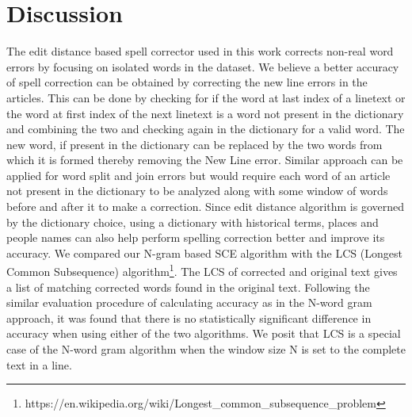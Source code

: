 \documentclass[preprint,11pt]{elsarticle}
\begin{document}
\section{Discussion}
\label{spell:discuss}
The edit distance based spell corrector used in this work corrects non-real word errors by focusing on isolated words in the dataset.
We believe a better accuracy of spell correction can be obtained by correcting the new line errors in the articles. This can be done by checking for if the word at last index of a linetext or the word at first index of the next linetext is a word not present in the dictionary and combining the two and checking again in the dictionary for a valid word. The new word, if present in the dictionary can be replaced by the two words from which it is formed thereby removing the New Line error. Similar approach can be applied for word split and join errors but would require each word of an article not present in the dictionary to be analyzed along with some window of words before and after it to make a correction. 
Since edit distance algorithm is governed by the dictionary choice, using a dictionary with historical terms, places and people names can also help perform spelling correction better and improve its accuracy.
We compared our N-gram based SCE algorithm with the LCS (Longest Common Subsequence) algorithm\footnote{https://en.wikipedia.org/wiki/Longest\_common\_subsequence\_problem}. The LCS of corrected and original text gives a list of matching corrected words found in the original text. Following the similar evaluation procedure of calculating accuracy as in the N-word gram approach, %
it was found that there is no statistically significant difference in accuracy when using either of the two algorithms. We posit that LCS is a special case of the N-word gram algorithm when the window size N is set to the complete text in a line.
\end{document}
